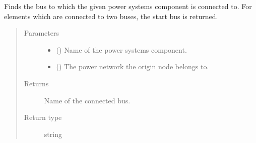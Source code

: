 \documentclass[letterpaper,10pt,english]{sphinxmanual}
\begin{document}
\begin{fulllineitems}
\label{\detokenize{apidoc:dreaminsg_integrated_model.src.network_sim_models.interdependencies.find_connected_transpo_node}}
\sphinxAtStartPar
Finds the bus to which the given power systems component is connected to. For elements which are connected to two buses, the start bus is returned.
\begin{quote}\begin{description}
\item[{Parameters}] \leavevmode\begin{itemize}
\item {} 
\sphinxAtStartPar
{} () \textendash{} Name of the power systems component.

\item {} 
\sphinxAtStartPar
{} () \textendash{} The power network the origin node belongs to.

\end{itemize}

\item[{Returns}] \leavevmode
\sphinxAtStartPar
Name of the connected bus.

\item[{Return type}] \leavevmode
\sphinxAtStartPar
string

\end{description}\end{quote}

\end{fulllineitems}

\end{document}
